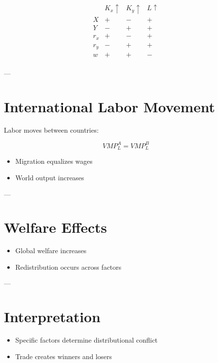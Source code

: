 \[
\begin{array}{c|ccc}
 & K_x \uparrow & K_y \uparrow & L \uparrow \\
\hline
X & + & - & + \\
Y & - & + & + \\
r_x & + & - & + \\
r_y & - & + & + \\
w & + & + & - \\
\end{array}
\]

---

\section{International Labor Movement}

Labor moves between countries:

\[
VMP_L^A = VMP_L^B
\]

\begin{itemize}
    \item Migration equalizes wages
    \item World output increases
\end{itemize}

---

\section{Welfare Effects}

\begin{itemize}
    \item Global welfare increases
    \item Redistribution occurs across factors
\end{itemize}

---

\section{Interpretation}

\begin{itemize}
    \item Specific factors determine distributional conflict
    \item Trade creates winners and losers
\end{itemize}